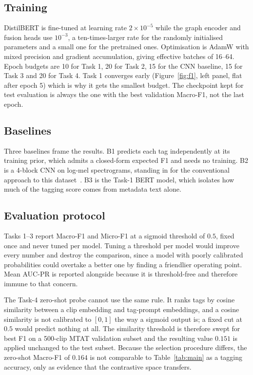 \documentclass{article}
\begin{document}
\subsection{Training}
DistilBERT is fine-tuned at learning rate $2\!\times\!10^{-5}$ while the graph
encoder and fusion heads use $10^{-3}$, a ten-times-larger rate for the
randomly initialised parameters and a small one for the pretrained ones.
Optimisation is AdamW with mixed precision and gradient accumulation, giving
effective batches of 16--64. Epoch budgets are 10 for Task 1, 20 for Task 2, 15
for the CNN baseline, 15 for Task 3 and 20 for Task 4. Task 1 converges early
(Figure~\ref{fig:f1}, left panel, flat after epoch 5) which is why it gets the
smallest budget. The checkpoint kept for test evaluation is always the one with
the best validation Macro-F1, not the last epoch.

\subsection{Baselines}
Three baselines frame the results. B1 predicts each tag independently at its
training prior, which admits a closed-form expected F1 and needs no training.
B2 is a 4-block CNN on log-mel spectrograms, standing in for the conventional
approach to this dataset~\cite{choi2016autotagging}. B3 is the Task-1 BERT
model, which isolates how much of the tagging score comes from metadata text
alone.

\subsection{Evaluation protocol}
\label{sec:protocol}
Tasks 1--3 report Macro-F1 and Micro-F1 at a sigmoid threshold of $0.5$, fixed
once and never tuned per model. Tuning a threshold per model would improve every
number and destroy the comparison, since a model with poorly calibrated
probabilities could overtake a better one by finding a friendlier operating
point. Mean AUC-PR is reported alongside because it is threshold-free and
therefore immune to that concern.

The Task-4 zero-shot probe cannot use the same rule. It ranks tags by cosine
similarity between a clip embedding and tag-prompt embeddings, and a cosine
similarity is not calibrated to $[0,1]$ the way a sigmoid output is; a fixed
cut at $0.5$ would predict nothing at all. The similarity threshold is
therefore swept for best F1 on a 500-clip MTAT validation subset and the
resulting value $0.151$ is applied unchanged to the test subset. Because the
selection procedure differs, the zero-shot Macro-F1 of $0.164$ is not
comparable to Table~\ref{tab:main} as a tagging accuracy, only as evidence that
the contrastive space transfers.
\end{document}
